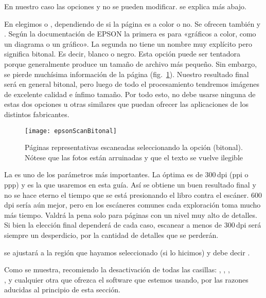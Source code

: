 \documentclass[%
	a5paper,
	10pt,
	twoside,
	openright,
	final,
]{memoir}
\begin{document}
{	En nuestro caso las opciones  y  no se pueden modificar.  se explica más abajo.

	En  elegimos  o , dependiendo de si la página es a color o no. Se ofrecen también  y . Según la documentación de EPSON la primera es para «gráficos a color, como un diagrama o un gráfico». La segunda no tiene un nombre muy explícito pero significa bitonal. Es decir, blanco o negro. Esta opción puede ser tentadora porque generalmente produce un tamaño de archivo más pequeño. Sin embargo, se pierde muchísima información de la página (fig.~\ref{fig:epsonScanBitonal}). Nuestro resultado final será en general bitonal, pero luego de todo el procesamiento tendremos imágenes de excelente calidad e ínfimo tamaño. Por todo esto, no debe usarse ninguna de estas dos opciones u otras similares que puedan ofrecer las aplicaciones de los distintos fabricantes.

	\begin{figure}
		\texttt{[image: epsonScanBitonal]}
		\caption[Páginas representativas escaneadas en bitonal]{Páginas representativas escaneadas seleccionando la opción  (bitonal). Nótese que las fotos están arruinadas y que el texto se vuelve ilegible\label{fig:epsonScanBitonal}}
	\end{figure}

	La  es uno de los parámetros más importantes. La óptima es de 300\,dpi (ppi o ppp) y es la que usaremos en esta guía. Así se obtiene un buen resultado final y no se hace eterno el tiempo que se está presionando el libro contra el escáner. 600\,dpi sería aún mejor, pero en los escáneres comunes cada exploración toma mucho más tiempo. Valdrá la pena solo para páginas con un nivel muy alto de detalles. Si bien la elección final dependerá de cada caso, escanear a menos de 300\,dpi será siempre un desperdicio, por la cantidad de detalles que se perderán.

	 se ajustará a la región que hayamos seleccionado (si lo hicimos) y  debe decir .

	Como se muestra, recomiendo la desactivación de todas las casillas: , , ,\\,  y cualquier otra que ofrezca el software que estemos usando, por las razones aducidas al principio de esta sección.

}
\end{document}
